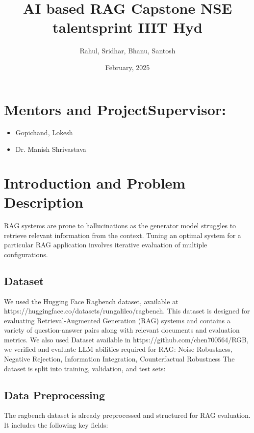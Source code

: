 \documentclass{article}
\title{AI based RAG Capstone NSE talentsprint IIIT Hyd}
\author{Rahul, Sridhar, Bhanu, Santosh}
\date{February, 2025}
\begin{document}
\maketitle

\section*{Mentors and ProjectSupervisor:}
\begin{itemize}
    \item Gopichand, Lokesh
    \item Dr. Manish Shrivastava
\end{itemize}

\tableofcontents

\section{Introduction and Problem Description}

RAG systems are prone to hallucinations as the generator model struggles to retrieve relevant information from the context. Tuning an optimal system for a particular RAG application involves iterative evaluation of multiple configurations.  

\subsection{Dataset}
We used the Hugging Face Ragbench dataset, available at https://huggingface.co/datasets/rungalileo/ragbench. This dataset is designed for evaluating Retrieval-Augmented Generation (RAG) systems and contains a variety of question-answer pairs along with relevant documents and evaluation metrics. We also used Dataset available in https://github.com/chen700564/RGB,
we verified and evaluate LLM abilities required for RAG: Noise Robustness, Negative Rejection, Information Integration, Counterfactual Robustness
The dataset is split into training, validation, and test sets:



\subsection{Data Preprocessing}
The ragbench dataset is already preprocessed and structured for RAG evaluation. It includes the following key fields:
\end{document}
